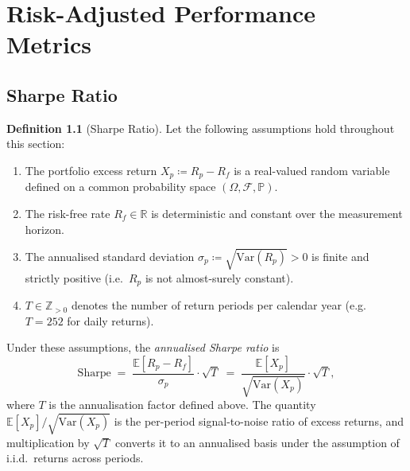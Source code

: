 \documentclass[12pt,openany]{book}
\newcommand{\E}{\mathbb{E}}
\numberwithin{equation}{chapter}
\theoremstyle{plain}
\theoremstyle{definition}
\newtheorem{definition}[theorem]{Definition}
\theoremstyle{remark}
\numberwithin{equation}{chapter}
\theoremstyle{plain}
\begin{document}
\chapter{Risk-Adjusted Performance Metrics}
\label{ch:metrics}

\section{Sharpe Ratio}

\begin{definition}[Sharpe Ratio]
\label{def:sharpe}
Let the following assumptions hold throughout this section:
\begin{enumerate}
  \item The portfolio excess return $X_p \coloneqq R_p - R_f$ is a
        real-valued random variable defined on a common probability
        space $(\Omega,\mathcal{F},\mathbb{P})$.
  \item The risk-free rate $R_f \in \mathbb{R}$ is deterministic and
        constant over the measurement horizon.
  \item The annualised standard deviation
        $\sigma_p \coloneqq \sqrt{\mathrm{Var}(R_p)} > 0$
        is finite and strictly positive (i.e.\ $R_p$ is not
        almost-surely constant).
  \item $T \in \mathbb{Z}_{>0}$ denotes the number of return
        periods per calendar year (e.g.\ $T = 252$ for daily returns).
\end{enumerate}
Under these assumptions, the \emph{annualised Sharpe ratio} is
\begin{equation}
  \mathrm{Sharpe} \;=\;
    \frac{\E[R_p - R_f]}{\sigma_p}\cdot\sqrt{T}
  \;=\;
    \frac{\E[X_p]}{\sqrt{\mathrm{Var}(X_p)}}\cdot\sqrt{T},
  \label{eq:sharpe}
\end{equation}
where $T$ is the annualisation factor defined above.
The quantity $\E[X_p]/\sqrt{\mathrm{Var}(X_p)}$ is the
per-period signal-to-noise ratio of excess returns, and
multiplication by $\sqrt{T}$ converts it to an annualised basis
under the assumption of i.i.d.\ returns across periods.
\end{definition}
\end{document}
